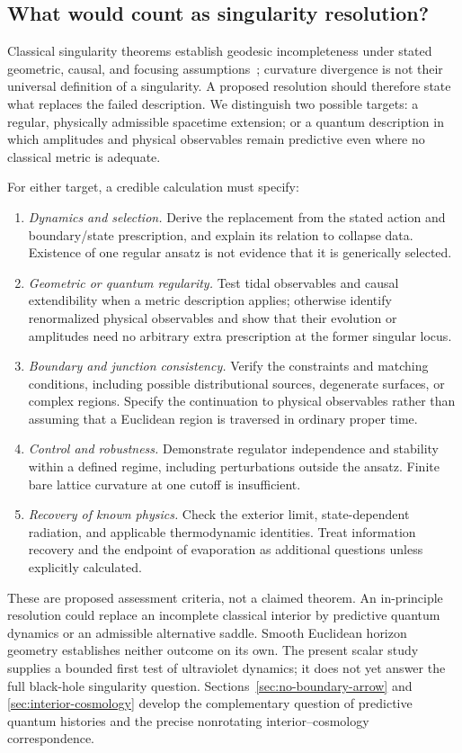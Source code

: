 \subsection{What would count as singularity resolution?}
\label{sec:singularity-resolution-criteria}

Classical singularity theorems establish geodesic incompleteness under stated geometric, causal, and focusing assumptions~\cite{Penrose:1965}; curvature divergence is not their universal definition of a singularity.  A proposed resolution should therefore state what replaces the failed description.  We distinguish two possible targets: a regular, physically admissible spacetime extension; or a quantum description in which amplitudes and physical observables remain predictive even where no classical metric is adequate.

For either target, a credible calculation must specify:
\begin{enumerate}
 \item \emph{Dynamics and selection.}  Derive the replacement from the stated action and boundary/state prescription, and explain its relation to collapse data.  Existence of one regular ansatz is not evidence that it is generically selected.
 \item \emph{Geometric or quantum regularity.}  Test tidal observables and causal extendibility when a metric description applies; otherwise identify renormalized physical observables and show that their evolution or amplitudes need no arbitrary extra prescription at the former singular locus.
 \item \emph{Boundary and junction consistency.}  Verify the constraints and matching conditions, including possible distributional sources, degenerate surfaces, or complex regions.  Specify the continuation to physical observables rather than assuming that a Euclidean region is traversed in ordinary proper time.
 \item \emph{Control and robustness.}  Demonstrate regulator independence and stability within a defined regime, including perturbations outside the ansatz.  Finite bare lattice curvature at one cutoff is insufficient.
 \item \emph{Recovery of known physics.}  Check the exterior limit, state-dependent radiation, and applicable thermodynamic identities.  Treat information recovery and the endpoint of evaporation as additional questions unless explicitly calculated.
\end{enumerate}
These are proposed assessment criteria, not a claimed theorem.  An in-principle resolution could replace an incomplete classical interior by predictive quantum dynamics or an admissible alternative saddle.  Smooth Euclidean horizon geometry establishes neither outcome on its own.  The present scalar study supplies a bounded first test of ultraviolet dynamics; it does not yet answer the full black-hole singularity question.  Sections~\ref{sec:no-boundary-arrow} and \ref{sec:interior-cosmology} develop the complementary question of predictive quantum histories and the precise nonrotating interior--cosmology correspondence.

